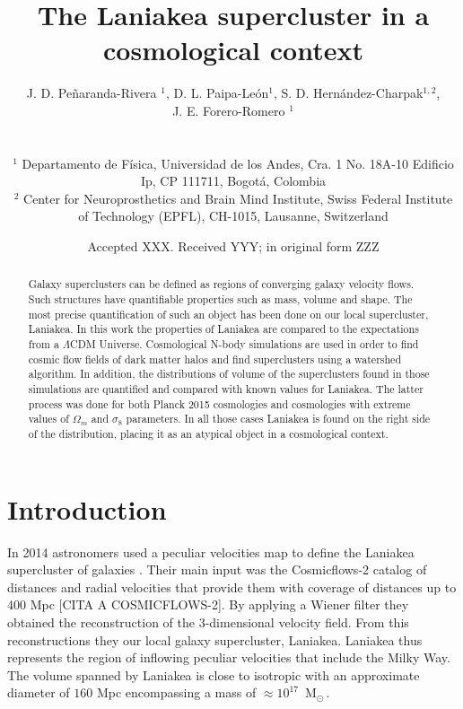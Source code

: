 \documentclass[usenatbib]{mnras}
\title[Laniakea in a cosmological context]{The Laniakea supercluster in a cosmological context}
\author[Pe\~naranda-Rivera et al.]{
\parbox[t]{\textwidth}{
    {J. D. Pe\~naranda-Rivera $^1$,} 
    {D. L. Paipa-Le\'on$^{1}$,}
    {S. D. Hern\'andez-Charpak$^{1,2}$,}\\
    {J. E. Forero-Romero $^{1}$}
}
\\\\
$^{1}$ Departamento de F\'isica, Universidad de los Andes, Cra. 1
  No. 18A-10 Edificio Ip, CP 111711, Bogot\'a, Colombia \\
$^{2}$ Center for Neuroprosthetics and Brain Mind Institute, Swiss
  Federal Institute of Technology (EPFL), CH-1015, Lausanne,
  Switzerland\\  
}
\date{Accepted XXX. Received YYY; in original form ZZZ}
\newcommand{\Msun}{\,{\rm M}$_{\odot}$\,}
\begin{document}
\label{firstpage}
\pagerange{\pageref{firstpage}--\pageref{lastpage}}
\maketitle

\maketitle
\begin{abstract}
Galaxy superclusters can be defined as regions of converging galaxy
velocity flows. Such structures have quantifiable properties such as
mass, volume and shape. The most precise quantification of such an
object has been done on our local supercluster, Laniakea. In this work
the properties of Laniakea are compared to the expectations from a
$\Lambda$CDM Universe. Cosmological N-body simulations are used in
order to find cosmic flow fields of dark matter halos and find
superclusters using a watershed algorithm. In addition, the
distributions of volume of the superclusters found in those
simulations are quantified and compared with known values for
Laniakea. The latter process was done for both Planck 2015 cosmologies
and cosmologies with extreme values of $\Omega_m$ and $\sigma_8$
parameters. In all those cases Laniakea is found on the right side of
the distribution, placing it as an atypical object in a cosmological
context.  
\end{abstract}

\begin{keywords}
\end{keywords}




\section{Introduction}


In 2014 astronomers used a peculiar velocities map  to 
define the Laniakea supercluster of galaxies
\citep{2014Natur.513...71T}.  
Their main input was the Cosmicflows-2 catalog of distances and radial
velocities that provide them with coverage of distances up to 400 Mpc
[CITA A COSMICFLOWS-2]. 
By applying a Wiener filter \citep{Zaroubi_1999} they obtained the
reconstruction of the 3-dimensional velocity field. 
From this reconstructions they our local galaxy supercluster, Laniakea.
Laniakea thus represents the region of inflowing peculiar velocities
that include the Milky Way. 
The volume spanned by Laniakea is close to isotropic with an 
approximate diameter of $160$ Mpc encompassing a mass of
$\approx 10^{17}$ \Msun.
\end{document}
